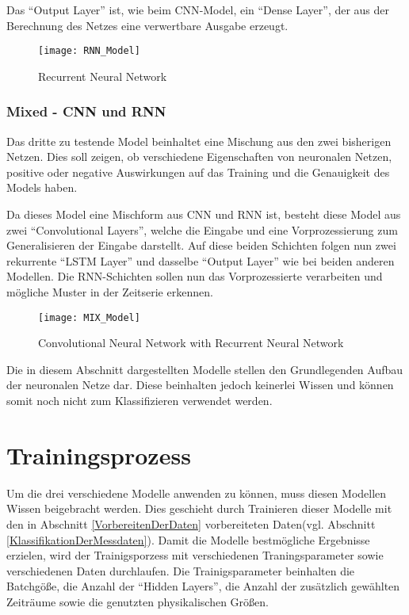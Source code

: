    \noindent
    Das "`Output Layer"' ist, wie beim \ac{CNN}-Model, ein "`Dense Layer"', der aus der Berechnung des Netzes eine verwertbare Ausgabe erzeugt.

    \begin{figure}[H]
        \centering
        \texttt{[image: RNN\_Model]}
        \caption{Recurrent Neural Network}
        \label{fig:RNN_MODEL}
    \end{figure}

    \subsubsection{Mixed - CNN und RNN}
    Das dritte zu testende Model beinhaltet eine Mischung aus den zwei bisherigen Netzen. 
    Dies soll zeigen, ob verschiedene Eigenschaften von neuronalen Netzen, positive oder negative Auswirkungen auf das Training und die Genauigkeit des Models haben.
    \newline

    \noindent
    Da dieses Model eine Mischform aus \ac{CNN} und \ac{RNN} ist, besteht diese Model aus zwei "`Convolutional Layers"', welche die Eingabe und eine Vorprozessierung zum Generalisieren der Eingabe darstellt.
    Auf diese beiden Schichten folgen nun zwei rekurrente "`LSTM Layer"' und dasselbe "`Output Layer"' wie bei beiden anderen Modellen.
    Die \ac{RNN}-Schichten sollen nun das Vorprozessierte verarbeiten und mögliche Muster in der Zeitserie erkennen.     

    \begin{figure}[H]
        \centering
        \texttt{[image: MIX\_Model]}
        \caption{Convolutional Neural Network with Recurrent Neural Network}
        \label{fig:MIX_MODEL}
    \end{figure}

    Die in diesem Abschnitt dargestellten Modelle stellen den Grundlegenden Aufbau der neuronalen Netze dar.
    Diese beinhalten jedoch keinerlei Wissen und können somit noch nicht zum Klassifizieren verwendet werden.    


\section{Trainingsprozess}
    Um die drei verschiedene Modelle anwenden zu können, muss diesen Modellen Wissen beigebracht werden.
    Dies geschieht durch Trainieren dieser Modelle mit den in Abschnitt \ref{VorbereitenDerDaten} vorbereiteten Daten(vgl. Abschnitt \ref{KlassifikationDerMessdaten}).
    Damit die Modelle bestmögliche Ergebnisse erzielen, wird der Trainigsporzess mit verschiedenen Traningsparameter sowie verschiedenen Daten durchlaufen.
    Die Trainigsparameter beinhalten die Batchgöße, die Anzahl der "`Hidden Layers"', die Anzahl der zusätzlich gewählten Zeiträume sowie die genutzten physikalischen Größen.
    

